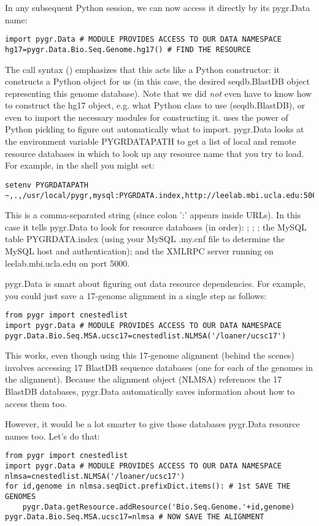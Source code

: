 \documentclass{howto}
\begin{document}
In any subsequent Python session, we can now access it directly by its
pygr.Data name:
\begin{verbatim}
import pygr.Data # MODULE PROVIDES ACCESS TO OUR DATA NAMESPACE
hg17=pygr.Data.Bio.Seq.Genome.hg17() # FIND THE RESOURCE
\end{verbatim}
The call syntax () emphasizes that this acts like a Python
constructor: it constructs a Python object for us (in this case, the
desired seqdb.BlastDB object representing this genome database).
Note that we did {\em not} even have to know how to construct the hg17 
object, e.g. what Python class to use (seqdb.BlastDB), or even to import
the necessary modules for constructing it.   uses the
power of Python pickling to figure out automatically what to import.
pygr.Data looks at the environment variable PYGRDATAPATH to get a list 
of local and remote resource databases in which to look up any resource name
that you try to load.  For example, in the shell you might set:
\begin{verbatim}
setenv PYGRDATAPATH ~,.,/usr/local/pygr,mysql:PYGRDATA.index,http://leelab.mbi.ucla.edu:5000
\end{verbatim}
This is a comma-separated string (since colon ':' appears inside URLs).
In this case it tells pygr.Data to look for resource databases (in order):
; ; ;
the MySQL table PYGRDATA.index (using your
MySQL .my.cnf file to determine the MySQL host and authentication);
and the XMLRPC server running on leelab.mbi.ucla.edu on port 5000.

pygr.Data is smart about figuring out data resource dependencies.
For example, you could just save a 17-genome alignment in a single step
as follows:
\begin{verbatim}
from pygr import cnestedlist
import pygr.Data # MODULE PROVIDES ACCESS TO OUR DATA NAMESPACE
pygr.Data.Bio.Seq.MSA.ucsc17=cnestedlist.NLMSA('/loaner/ucsc17')
\end{verbatim}
This works, even though using this 17-genome alignment (behind the
scenes) involves accessing 17 BlastDB sequence databases (one for each
of the genomes in the alignment).  Because the alignment object (NLMSA)
references the 17 BlastDB databases, pygr.Data automatically saves information
about how to access them too.

However, it would be a lot smarter to give those databases pygr.Data resource
names too.  Let's do that:
\begin{verbatim}
from pygr import cnestedlist
import pygr.Data # MODULE PROVIDES ACCESS TO OUR DATA NAMESPACE
nlmsa=cnestedlist.NLMSA('/loaner/ucsc17')
for id,genome in nlmsa.seqDict.prefixDict.items(): # 1st SAVE THE GENOMES
    pygr.Data.getResource.addResource('Bio.Seq.Genome.'+id,genome)
pygr.Data.Bio.Seq.MSA.ucsc17=nlmsa # NOW SAVE THE ALIGNMENT
\end{verbatim}
\end{document}
